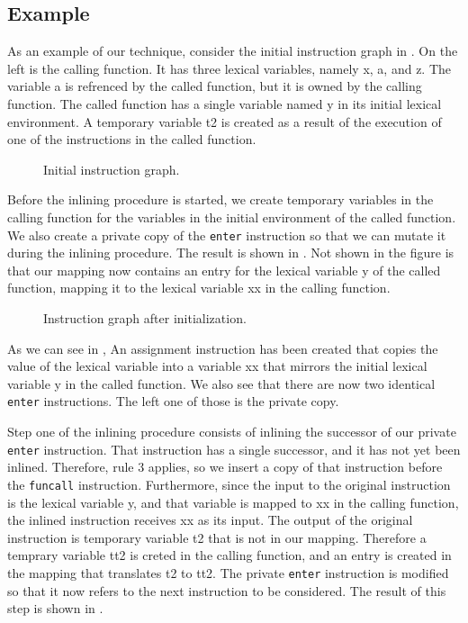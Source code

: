 \subsection{Example}

As an example of our technique, consider the initial instruction graph
in .  On the left is the calling function.  It has three
lexical variables, namely x, a, and z.  The variable a is refrenced by
the called function, but it is owned by the calling function.  The
called function has a single variable named y in its initial lexical
environment.  A temporary variable t2 is created as a result of the
execution of one of the instructions in the called function.

\begin{figure}
\begin{center}
\end{center}
\caption{\label{fig31}
Initial instruction graph.}
\end{figure}

Before the inlining procedure is started, we create temporary
variables in the calling function for the variables in the initial
environment of the called function.  We also create a private copy of
the \texttt{enter} instruction so that we can mutate it during the
inlining procedure.  The result is shown in .  Not shown
in the figure is that our mapping now contains an entry for the
lexical variable y of the called function, mapping it to the lexical
variable xx in the calling function.

\begin{figure}
\begin{center}
\end{center}
\caption{\label{fig32}
Instruction graph after initialization.}
\end{figure}

As we can see in , An assignment instruction has been
created that copies the value of the lexical variable into a variable
xx that mirrors the initial lexical variable y in the called
function.  We also see that there are now two identical \texttt{enter}
instructions.  The left one of those is the private copy.

Step one of the inlining procedure consists of inlining the successor
of our private \texttt{enter} instruction.  That instruction has a
single successor, and it has not yet been inlined.  Therefore, rule 3
applies, so we insert a copy of that instruction before the
\texttt{funcall} instruction.  Furthermore, since the input to the
original instruction is the lexical variable y, and that variable is
mapped to xx in the calling function, the inlined instruction receives
xx as its input.  The output of the original instruction is temporary
variable t2 that is not in our mapping.  Therefore a temprary variable
tt2 is creted in the calling function, and an entry is created in the
mapping that translates t2 to tt2.  The private \texttt{enter}
instruction is modified so that it now refers to the next instruction
to be considered.  The result of this step is shown in .

